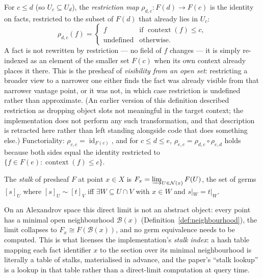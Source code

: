 \begin{definition}
\label{def:restriction}
For $c \leq d$ (so $U_c \subseteq U_d$), the \emph{restriction map}
$\rho_{d,c}: F(d) \to F(c)$ is the identity on facts, restricted to the
subset of $F(d)$ that already lies in $U_c$:
\[
\rho_{d,c}(f) =
\begin{cases}
f & \text{if } \operatorname{context}(f) \leq c, \\
\text{undefined} & \text{otherwise.}
\end{cases}
\]
A fact is not rewritten by restriction --- no field of $f$ changes --- it
is simply re-indexed as an element of the smaller set $F(c)$ when its own
context already places it there. This is the presheaf of \emph{visibility
from an open set}: restricting a broader view to a narrower one either
finds the fact was already visible from that narrower vantage point, or
it was not, in which case restriction is undefined rather than
approximate. (An earlier version of this definition described
restriction as dropping object slots not meaningful in the target
context; the implementation does not perform any such transformation,
and that description is retracted here rather than left standing
alongside code that does something else.)
Functoriality: $\rho_{c,c} = \operatorname{id}_{F(c)}$, and for
$c \leq d \leq e$, $\rho_{e,c} = \rho_{d,c} \circ \rho_{e,d}$ holds
because both sides equal the identity restricted to
$\{f \in F(e) : \operatorname{context}(f) \leq c\}$.
\end{definition}

\begin{definition}[Stalk]
\label{def:stalk}
The \emph{stalk} of presheaf $F$ at point $x \in X$ is
$F_x = \varinjlim_{U \in \mathcal{N}(x)} F(U)$,
the set of germs $[s]_U$ where $[s]_U \sim [t]_V$ iff $\exists W \subseteq U \cap V$
with $x \in W$ and $s|_W = t|_W$.
\end{definition}

On an Alexandrov space this direct limit is not an abstract object: every
point has a minimal open neighbourhood $\mathcal{B}(x)$
(Definition~\ref{def:neighbourhood}), the limit collapses to
$F_x \cong F(\mathcal{B}(x))$, and no germ equivalence needs to be
computed. This is what licenses the implementation's \emph{stalk index}:
a hash table mapping each fact identifier $x$ to the section over its
minimal neighbourhood is literally a table of stalks, materialised in
advance, and the paper's ``stalk lookup'' is a lookup in that table
rather than a direct-limit computation at query time.

